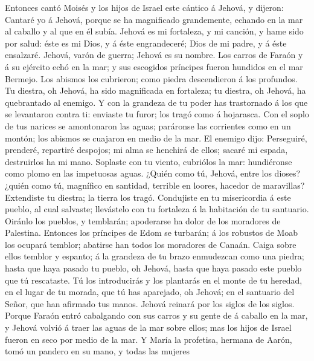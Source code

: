  Entonces cantó Moisés y los hijos de Israel este cántico á
Jehová, y dijeron: Cantaré yo á Jehová, porque se ha magnificado
grandemente, echando en la mar al caballo y al que en él subía.
 Jehová es mi fortaleza, y mi canción, y hame sido por
salud: éste es mi Dios, y á éste engrandeceré; Dios de mi padre, y á
éste ensalzaré.  Jehová, varón de guerra; Jehová es su
nombre.  Los carros de Faraón y á su ejército echó en la
mar; y sus escogidos príncipes fueron hundidos en el mar Bermejo.
 Los abismos los cubrieron; como piedra descendieron á los
profundos.  Tu diestra, oh Jehová, ha sido magnificada en
fortaleza; tu diestra, oh Jehová, ha quebrantado al enemigo.
 Y con la grandeza de tu poder has trastornado á los que se
levantaron contra ti: enviaste tu furor; los tragó como á hojarasca.
 Con el soplo de tus narices se amontonaron las aguas;
paráronse las corrientes como en un montón; los abismos se cuajaron en
medio de la mar.  El enemigo dijo: Perseguiré, prenderé,
repartiré despojos; mi alma se henchirá de ellos; sacaré mi espada,
destruirlos ha mi mano.  Soplaste con tu viento, cubriólos
la mar: hundiéronse como plomo en las impetuosas aguas. 
¿Quién como tú, Jehová, entre los dioses? ¿quién como tú, magnífico en
santidad, terrible en loores, hacedor de maravillas? 
Extendiste tu diestra; la tierra los tragó.  Condujiste en
tu misericordia á este pueblo, al cual salvaste; llevástelo con tu
fortaleza á la habitación de tu santuario.  Oiránlo los
pueblos, y temblarán; apoderarse ha dolor de los moradores de Palestina.
 Entonces los príncipes de Edom se turbarán; á los robustos
de Moab los ocupará temblor; abatirse han todos los moradores de Canaán.
 Caiga sobre ellos temblor y espanto; á la grandeza de tu
brazo enmudezcan como una piedra; hasta que haya pasado tu pueblo, oh
Jehová, hasta que haya pasado este pueblo que tú rescataste.
 Tú los introducirás y los plantarás en el monte de tu
heredad, en el lugar de tu morada, que tú has aparejado, oh Jehová; en
el santuario del Señor, que han afirmado tus manos.  Jehová
reinará por los siglos de los siglos.  Porque Faraón entró
cabalgando con sus carros y su gente de á caballo en la mar, y Jehová
volvió á traer las aguas de la mar sobre ellos; mas los hijos de Israel
fueron en seco por medio de la mar.  Y María la profetisa,
hermana de Aarón, tomó un pandero en su mano, y todas las mujeres
